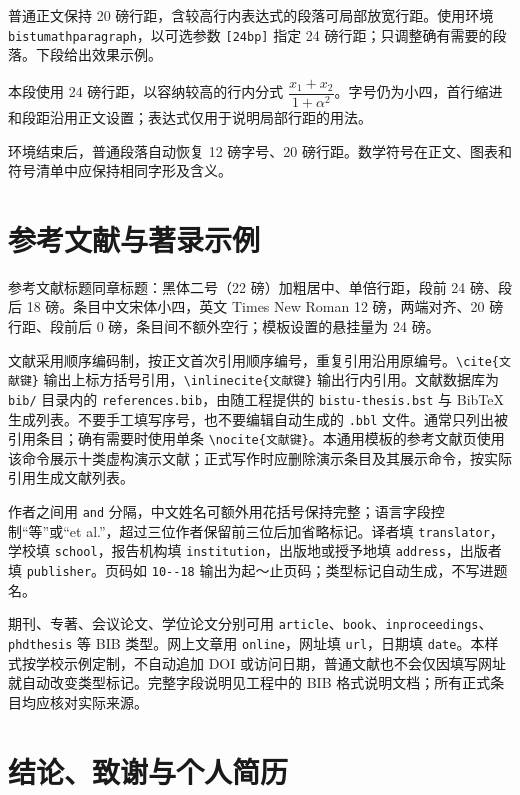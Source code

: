 普通正文保持 20 磅行距，含较高行内表达式的段落可局部放宽行距。使用环境 \texttt{bistumathparagraph}，以可选参数 \verb|[24bp]| 指定 24 磅行距；只调整确有需要的段落。下段给出效果示例。

\begin{bistumathparagraph}[24bp]
本段使用 24 磅行距，以容纳较高的行内分式 $\dfrac{x_1+x_2}{1+\alpha^2}$。字号仍为小四，首行缩进和段距沿用正文设置；表达式仅用于说明局部行距的用法。
\end{bistumathparagraph}

环境结束后，普通段落自动恢复 12 磅字号、20 磅行距。数学符号在正文、图表和符号清单中应保持相同字形及含义。

\section{参考文献与著录示例}

参考文献标题同章标题：黑体二号（22 磅）加粗居中、单倍行距，段前 24 磅、段后 18 磅。条目中文宋体小四，英文 Times New Roman 12 磅，两端对齐、20 磅行距、段前后 0 磅，条目间不额外空行；模板设置的悬挂量为 24 磅。

文献采用顺序编码制，按正文首次引用顺序编号，重复引用沿用原编号。\verb|\cite{文献键}| 输出上标方括号引用，\verb|\inlinecite{文献键}| 输出行内引用。文献数据库为 \texttt{bib/} 目录内的 \texttt{references.bib}，由随工程提供的 \texttt{bistu-thesis.bst} 与 BibTeX 生成列表。不要手工填写序号，也不要编辑自动生成的 \texttt{.bbl} 文件。通常只列出被引用条目；确有需要时使用单条 \verb|\nocite{文献键}|。本通用模板的参考文献页使用该命令展示十类虚构演示文献；正式写作时应删除演示条目及其展示命令，按实际引用生成文献列表。

作者之间用 \texttt{and} 分隔，中文姓名可额外用花括号保持完整；语言字段控制“等”或“et al.”，超过三位作者保留前三位后加省略标记。译者填 \texttt{translator}，学校填 \texttt{school}，报告机构填 \texttt{institution}，出版地或授予地填 \texttt{address}，出版者填 \texttt{publisher}。页码如 \verb|10--18| 输出为起～止页码；类型标记自动生成，不写进题名。

期刊、专著、会议论文、学位论文分别可用 \texttt{article}、\texttt{book}、\texttt{inproceedings}、\texttt{phdthesis} 等 BIB 类型。网上文章用 \texttt{online}，网址填 \texttt{url}，日期填 \texttt{date}。本样式按学校示例定制，不自动追加 DOI 或访问日期，普通文献也不会仅因填写网址就自动改变类型标记。完整字段说明见工程中的 BIB 格式说明文档；所有正式条目均应核对实际来源。



\section{结论、致谢与个人简历}

